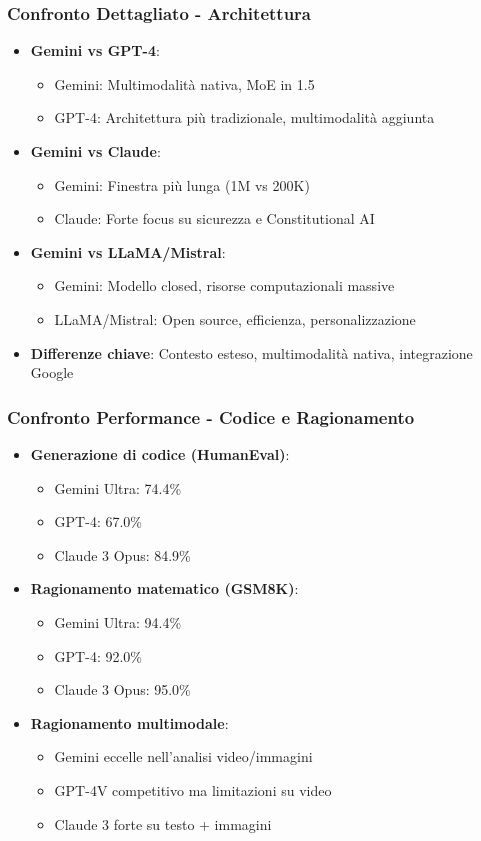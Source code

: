 \documentclass[aspectratio=169]{beamer}
\begin{document}
\begin{frame}
\frametitle{Confronto Dettagliato - Architettura}
\begin{itemize}
    \item \textbf{Gemini vs GPT-4}:
    \begin{itemize}
        \item Gemini: Multimodalità nativa, MoE in 1.5
        \item GPT-4: Architettura più tradizionale, multimodalità aggiunta
    \end{itemize}
    \item \textbf{Gemini vs Claude}:
    \begin{itemize}
        \item Gemini: Finestra più lunga (1M vs 200K)
        \item Claude: Forte focus su sicurezza e Constitutional AI
    \end{itemize}
    \item \textbf{Gemini vs LLaMA/Mistral}:
    \begin{itemize}
        \item Gemini: Modello closed, risorse computazionali massive
        \item LLaMA/Mistral: Open source, efficienza, personalizzazione
    \end{itemize}
    \item \textbf{Differenze chiave}: Contesto esteso, multimodalità nativa, integrazione Google
\end{itemize}
\end{frame}
%
%
\begin{frame}
\frametitle{Confronto Performance - Codice e Ragionamento}
\begin{itemize}
    \item \textbf{Generazione di codice (HumanEval)}:
    \begin{itemize}
        \item Gemini Ultra: 74.4\%
        \item GPT-4: 67.0\%
        \item Claude 3 Opus: 84.9\%
    \end{itemize}
    \item \textbf{Ragionamento matematico (GSM8K)}:
    \begin{itemize}
        \item Gemini Ultra: 94.4\%
        \item GPT-4: 92.0\%
        \item Claude 3 Opus: 95.0\%
    \end{itemize}
    \item \textbf{Ragionamento multimodale}:
    \begin{itemize}
        \item Gemini eccelle nell'analisi video/immagini
        \item GPT-4V competitivo ma limitazioni su video
        \item Claude 3 forte su testo + immagini
    \end{itemize}
\end{itemize}
\end{frame}
\end{document}
